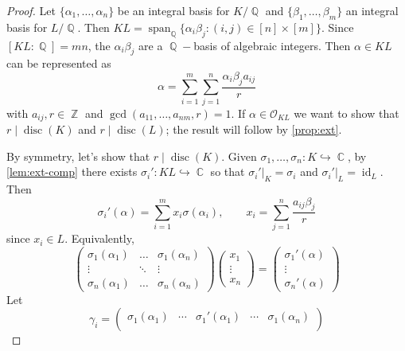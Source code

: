 \documentclass[11pt, a4paper]{memoir}
\DeclareMathOperator{\Q}{{\mathbb{Q}}}
\DeclareMathOperator{\Z}{{\mathbb{Z}}}
\DeclareMathOperator{\C}{{\mathbb{C}}}
\newcommand{\hto}[0]{\ensuremath{\hookrightarrow}}
\theoremstyle{change}
\theoremstyle{plain}
\theoremstyle{nonumberplain}
\newtheorem{proof}{Proof}
\DeclareMathOperator{\disc}{disc}
\DeclareMathOperator{\id}{id}
\DeclareMathOperator{\spn}{span}
\numberwithin{equation}{section}
\begin{document}
\begin{proof}
    Let $\{\alpha_1,\ldots,\alpha_n\}$ be an integral basis for $K/\Q$ and $\{\beta_1,\ldots,\beta_m\}$ an integral basis for $L/\Q$.
    Then $KL=\spn_{\Q}\{\alpha_i\beta_j:(i,j)\in[n]\times[m]\}$.
    Since $[KL:\Q]=mn$, the $\alpha_i\beta_j$ are a $\Q-$basis of algebraic integers.
    Then $\alpha\in KL$ can be represented as
    \begin{equation*}
        \alpha=\sum\limits_{i=1}^m\sum\limits_{j=1}^n\frac{\alpha_i\beta_ja_{ij}}{r}
    \end{equation*}
    with $a_{ij},r\in\Z$ and $\gcd(a_{11},\ldots,a_{nm},r)=1$.
    If $\alpha\in\mathcal{O}_{KL}$ we want to show that $r\mid\disc(K)$ and $r\mid\disc(L)$; the result will follow by \cref{prop:ext}.
    
    By symmetry, let's show that $r\mid\disc(K)$.
    Given $\sigma_1,\ldots,\sigma_n:K\hto\C$, by \cref{lem:ext-comp} there exists $\sigma_i':KL\hto\C$ so that $\sigma_i'|_K=\sigma_i$ and $\sigma_i'|_L=\id_L$.
    Then
    \begin{equation*}
        \sigma_i'(\alpha) = \sum\limits_{i=1}^m x_i\sigma(\alpha_i),\qquad x_i=\sum\limits_{j=1}^n\frac{a_{ij}\beta_j}{r}
    \end{equation*}
    since $x_i\in L$.
    Equivalently,
    \begin{equation*}
        \begin{pmatrix}
            \sigma_1(\alpha_1)&\hdots&\sigma_1(\alpha_n)\\
            \vdots&\ddots&\vdots\\
            \sigma_n(\alpha_1)&\hdots&\sigma_n(\alpha_n)
        \end{pmatrix}
        \begin{pmatrix}
            x_1\\\vdots\\x_n
        \end{pmatrix}
        =
        \begin{pmatrix}
            \sigma_1'(\alpha)\\\vdots\\\sigma_n'(\alpha)
        \end{pmatrix}
    \end{equation*}
    Let
    \begin{equation*}
        \gamma_i=
        \begin{pmatrix}
            \sigma_1(\alpha_1)&\cdots&\sigma_1'(\alpha_1)&\cdots&\sigma_1(\alpha_n)\\

\end{pmatrix}
\end{equation*}
\end{proof}
\end{document}
